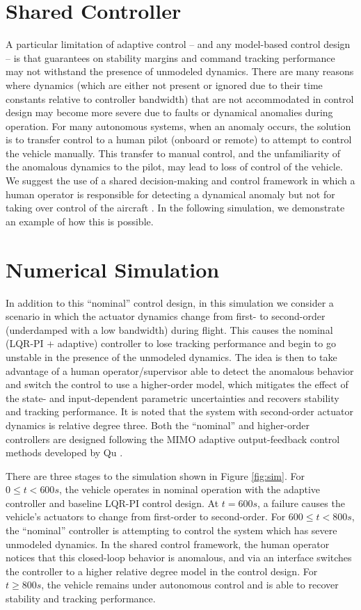 \documentclass[english]{IEEEtran}
\begin{document}
\section{Shared Controller}
A particular limitation of adaptive control -- and any model-based control design -- is that guarantees on stability margins and command tracking performance may not withstand the presence of unmodeled dynamics. There are many reasons where dynamics (which are either not present or ignored due to their time constants relative to controller bandwidth) that are not accommodated in control design may become more severe due to faults or dynamical anomalies during operation. For many autonomous systems, when an anomaly occurs, the solution is to transfer control to a human pilot (onboard or remote) to attempt to control the vehicle manually. This transfer to manual control, and the unfamiliarity of the anomalous dynamics to the pilot, may lead to loss of control of the vehicle. We suggest the use of a shared decision-making and control framework in which a human operator is responsible for detecting a dynamical anomaly but not for taking over control of the aircraft \cite{thomsen2018}. In the following simulation, we demonstrate an example of how this is possible.

\section{Numerical Simulation}
In addition to this ``nominal'' control design, in this simulation we consider a scenario in which the actuator dynamics change from first- to second-order (underdamped with a low bandwidth) during flight. This causes the nominal (LQR-PI + adaptive) controller to lose tracking performance and begin to go unstable in the presence of the unmodeled dynamics. The idea is then to take advantage of a human operator/supervisor able to detect the anomalous behavior and switch the control to use a higher-order model, which mitigates the effect of the state- and input-dependent parametric uncertainties and recovers stability and tracking performance. It is noted that the system with second-order actuator dynamics is relative degree three. Both the ``nominal'' and higher-order controllers are designed following the MIMO adaptive output-feedback control methods developed by Qu \cite{qu2016}.

There are three stages to the simulation shown in Figure \ref{fig:sim}. For $0 \leq t < 600 s$, the vehicle operates in nominal operation with the adaptive controller and baseline LQR-PI control design. At $t = 600 s$, a failure causes the vehicle's actuators to change from first-order to second-order. For $600 \leq t < 800 s$, the ``nominal'' controller is attempting to control the system which has severe unmodeled dynamics. In the shared control framework, the human operator notices that this closed-loop behavior is anomalous, and via an interface switches the controller to a higher relative degree model in the control design. For $t \geq 800 s$, the vehicle remains under autonomous control and is able to recover stability and tracking performance.
\end{document}
